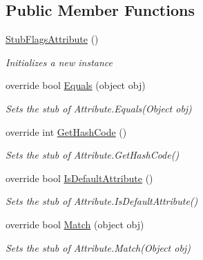 \subsection*{Public Member Functions}
\begin{DoxyCompactItemize}
\item 
\hyperlink{class_system_1_1_fakes_1_1_stub_flags_attribute_a0cd6fbd2fe1d12adbf10adcb2a0641b4}{Stub\-Flags\-Attribute} ()
\begin{DoxyCompactList}\small\item\em Initializes a new instance\end{DoxyCompactList}\item 
override bool \hyperlink{class_system_1_1_fakes_1_1_stub_flags_attribute_ae5f0c6b6173a51ec899746d7e1018b2e}{Equals} (object obj)
\begin{DoxyCompactList}\small\item\em Sets the stub of Attribute.\-Equals(\-Object obj)\end{DoxyCompactList}\item 
override int \hyperlink{class_system_1_1_fakes_1_1_stub_flags_attribute_ad33906a4a7a809175e51d2869836fd3a}{Get\-Hash\-Code} ()
\begin{DoxyCompactList}\small\item\em Sets the stub of Attribute.\-Get\-Hash\-Code()\end{DoxyCompactList}\item 
override bool \hyperlink{class_system_1_1_fakes_1_1_stub_flags_attribute_aaabd9cf482ae0068428138bda039409c}{Is\-Default\-Attribute} ()
\begin{DoxyCompactList}\small\item\em Sets the stub of Attribute.\-Is\-Default\-Attribute()\end{DoxyCompactList}\item 
override bool \hyperlink{class_system_1_1_fakes_1_1_stub_flags_attribute_ac7bfaacc514806b880dee4c6dfaed42e}{Match} (object obj)
\begin{DoxyCompactList}\small\item\em Sets the stub of Attribute.\-Match(\-Object obj)\end{DoxyCompactList}\end{DoxyCompactItemize}
